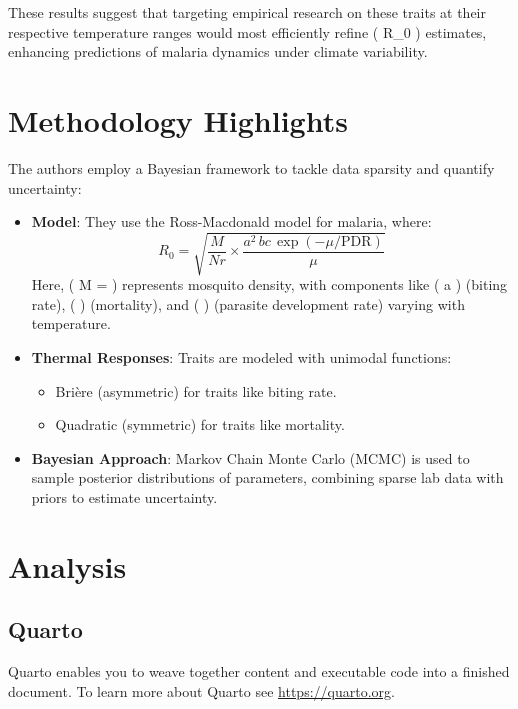 \documentclass[
  letterpaper,
  DIV=11,
  numbers=noendperiod]{scrreprt}
\providecommand{\tightlist}{%
  \setlength{\itemsep}{0pt}\setlength{\parskip}{0pt}}
\begin{document}
These results suggest that targeting empirical research on these traits
at their respective temperature ranges would most efficiently refine (
R\_0 ) estimates, enhancing predictions of malaria dynamics under
climate variability.


\chapter{Methodology Highlights}\label{methodology-highlights}

The authors employ a Bayesian framework to tackle data sparsity and
quantify uncertainty:

\begin{itemize}
\item
  \textbf{Model}: They use the Ross-Macdonald model for malaria, where:
  \[R_0 = \sqrt{\frac{M}{N r} \times \frac{a^2 \, bc \, \exp(-\mu / \text{PDR})}{\mu}}\]
  Here, ( M =  )
  represents mosquito density, with components like ( a ) (biting rate),
  ( \mu ) (mortality), and (  ) (parasite development rate)
  varying with temperature.
\item
  \textbf{Thermal Responses}: Traits are modeled with unimodal
  functions:

  \begin{itemize}
  \tightlist
  \item
    Brière (asymmetric) for traits like biting rate.
  \item
    Quadratic (symmetric) for traits like mortality.
  \end{itemize}
\item
  \textbf{Bayesian Approach}: Markov Chain Monte Carlo (MCMC) is used to
  sample posterior distributions of parameters, combining sparse lab
  data with priors to estimate uncertainty.
\end{itemize}


\chapter{Analysis}\label{analysis}

\section{Quarto}\label{quarto}

Quarto enables you to weave together content and executable code into a
finished document. To learn more about Quarto see
\url{https://quarto.org}.
\end{document}

